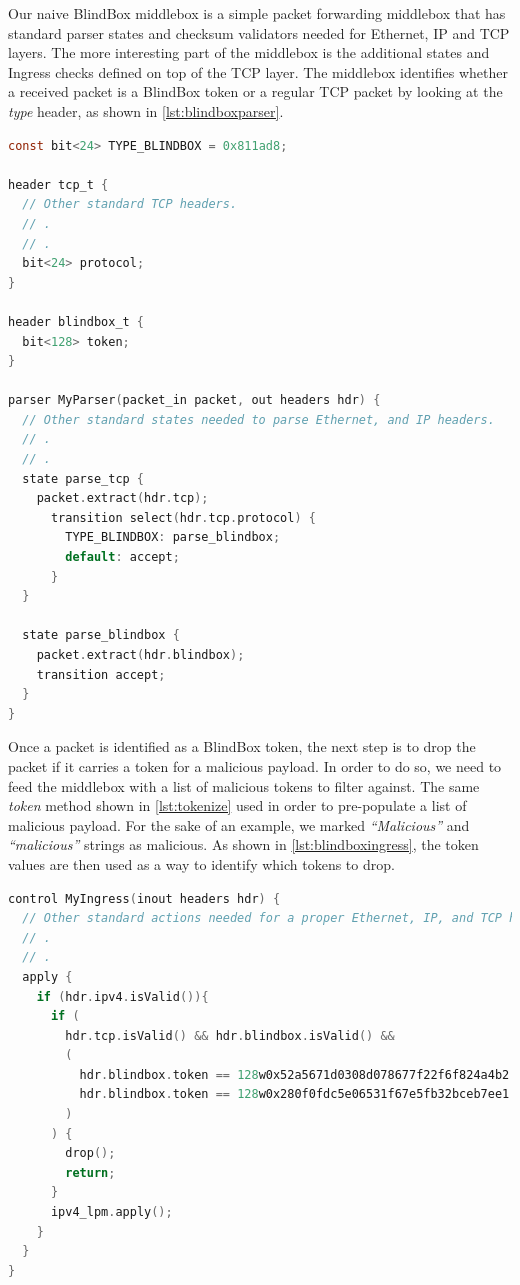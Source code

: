 \documentclass{winslabreport}
\begin{document}
Our naive BlindBox middlebox is a simple packet forwarding middlebox that has standard parser states and checksum validators needed for Ethernet, IP and TCP layers. The more interesting part of the middlebox is the additional states and Ingress checks defined on top of the TCP layer. The middlebox identifies whether a received packet is a BlindBox token or a regular TCP packet by looking at the \emph{type} header, as shown in \autoref{lst:blindboxparser}.

\begin{lstlisting}[caption={Middlebox Parser},label={lst:blindboxparser},language=C]
const bit<24> TYPE_BLINDBOX = 0x811ad8;

header tcp_t {
  // Other standard TCP headers.
  // .
  // .
  bit<24> protocol;
}

header blindbox_t {
  bit<128> token;
}

parser MyParser(packet_in packet, out headers hdr) {
  // Other standard states needed to parse Ethernet, and IP headers.
  // .
  // .
  state parse_tcp {
    packet.extract(hdr.tcp);
      transition select(hdr.tcp.protocol) {
        TYPE_BLINDBOX: parse_blindbox;
        default: accept;
      }
  }

  state parse_blindbox {
    packet.extract(hdr.blindbox);
    transition accept;
  }
}
\end{lstlisting}

Once a packet is identified as a BlindBox token, the next step is to drop the packet if it carries a token for a malicious payload. In order to do so, we need to feed the middlebox with a list of malicious tokens to filter against. The same \emph{token} method shown in \autoref{lst:tokenize} used in order to pre-populate a list of malicious payload. For the sake of an example, we marked \emph{``Malicious''} and \emph{``malicious''} strings as malicious. As shown in \autoref{lst:blindboxingress}, the token values are then used as a way to identify which tokens to drop.

\begin{lstlisting}[caption={Middlebox Ingress},label={lst:blindboxingress},language=C]
control MyIngress(inout headers hdr) {
  // Other standard actions needed for a proper Ethernet, IP, and TCP handling.
  // .
  // .
  apply {
    if (hdr.ipv4.isValid()){
      if (
        hdr.tcp.isValid() && hdr.blindbox.isValid() &&
        (
          hdr.blindbox.token == 128w0x52a5671d0308d078677f22f6f824a4b2 ||
          hdr.blindbox.token == 128w0x280f0fdc5e06531f67e5fb32bceb7ee1
        )
      ) {
        drop();
        return;
      }
      ipv4_lpm.apply();
    }
  }
}
\end{lstlisting}
\end{document}
